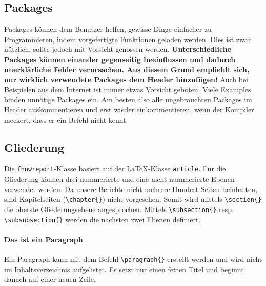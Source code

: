 \subsection{Packages}
Packages können dem Benutzer helfen, gewisse Dinge einfacher zu Programmieren, indem vorgefertigte Funktionen geladen werden. Dies ist zwar nützlich, sollte jedoch mit Vorsicht genossen werden.
\textbf{Unterschiedliche Packages können einander gegenseitig beeinflussen und dadurch unerklärliche Fehler verursachen. Aus diesem Grund empfiehlt sich, nur wirklich verwendete Packages dem Header hinzufügen!}
Auch bei Beispielen aus dem Internet ist immer etwas Vorsicht geboten. Viele Examples binden unnötige Packages ein. Am besten also alle ungebrauchten Packages im Header auskommentieren und erst wieder einkommentieren, wenn der Kompiler meckert, dass er ein Befehl nicht kennt.

\subsection{Gliederung}
Die \texttt{fhnwreport}-Klasse basiert auf der \LaTeX -Klasse \texttt{article}. Für die Gliederung können drei nummerierte und eine nicht nummerierte Ebenen verwendet werden. Da unsere Berichte nicht mehrere Hundert Seiten beinhalten, sind Kapitelseiten (\verb|\chapter{}|) nicht vorgesehen. Somit wird mittels \verb|\section{}| die oberste Gliederungsebene angesprochen. Mittels \verb|\subsection{}| resp. \verb|\subsubsection{}| werden die nächsten zwei Ebenen definiert. 

\paragraph{Das ist ein Paragraph}
Ein Paragraph kann mit dem Befehl \verb|\paragraph{}| erstellt werden und wird nicht im Inhaltsverzeichnis aufgelistet. Es setzt nur einen fetten Titel und beginnt danach auf einer neuen Zeile.

